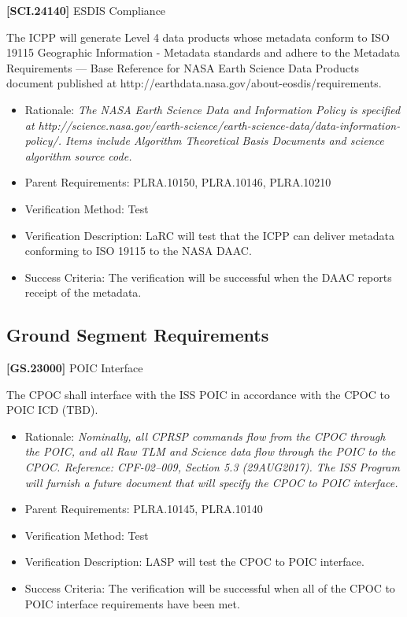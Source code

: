 \textbf{[SCI.24140]} \gls{ESDIS} Compliance

The \gls{ICPP} will generate Level 4 data products whose metadata conform to ISO 19115 Geographic Information - Metadata standards and adhere to the Metadata Requirements --- Base Reference for NASA Earth Science Data Products document published at http:\slash \slash earthdata.nasa.gov\slash about-eosdis\slash requirements.

\begin{itemize}
\item{} Rationale: \emph{The NASA Earth Science Data and Information Policy is specified at http:\slash \slash science.nasa.gov\slash earth-science\slash earth-science-data\slash data-information-policy\slash . Items include Algorithm Theoretical Basis Documents and science algorithm source code.}

\item{} Parent Requirements: PLRA.10150, PLRA.10146, PLRA.10210

\item{} Verification Method: Test

\item{} Verification Description: \gls{LaRC} will \gls{test} that the \gls{ICPP} can deliver metadata conforming to ISO 19115 to the NASA \gls{DAAC}.

\item{} Success Criteria: The verification will be successful when the \gls{DAAC} reports receipt of the metadata.

\end{itemize}

\subsection{Ground Segment Requirements}
\label{groundsegmentrequirements}

\textbf{[GS.23000]} \gls{POIC} Interface

The \gls{CPOC} shall interface with the \gls{ISS} \gls{POIC} in accordance with the \gls{CPOC} to \gls{POIC} ICD (TBD).

\begin{itemize}
\item{} Rationale: \emph{Nominally, all CPRSP commands flow from the CPOC through the POIC, and all Raw TLM and Science data flow through the POIC to the CPOC. Reference: CPF-02--009, Section 5.3 (29AUG2017). The ISS Program will furnish a future document that will specify the CPOC to POIC interface.}

\item{} Parent Requirements: PLRA.10145, PLRA.10140

\item{} Verification Method: Test

\item{} Verification Description: \gls{LASP} will \gls{test} the \gls{CPOC} to \gls{POIC} interface.

\item{} Success Criteria: The verification will be successful when all of the \gls{CPOC} to \gls{POIC} interface requirements have been met.

\end{itemize}

